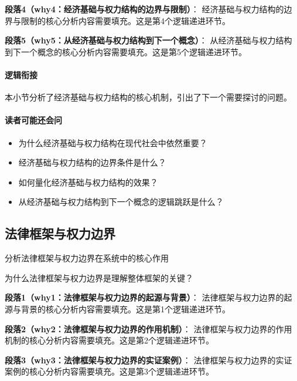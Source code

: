 \documentclass[../main.tex]{subfiles}
\begin{document}
{{\textbf{段落4（why4：经济基础与权力结构的边界与限制）}：
经济基础与权力结构的边界与限制的核心分析内容需要填充。这是第4个逻辑递进环节。


\textbf{段落5（why5：从经济基础与权力结构到下一个概念）}：
从经济基础与权力结构到下一个概念的核心分析内容需要填充。这是第5个逻辑递进环节。


\paragraph*{逻辑衔接}
本小节分析了经济基础与权力结构的核心机制，引出了下一个需要探讨的问题。

\paragraph*{读者可能还会问}
\begin{itemize}
\item 为什么经济基础与权力结构在现代社会中依然重要？
\item 经济基础与权力结构的边界条件是什么？
\item 如何量化经济基础与权力结构的效果？
\item 从经济基础与权力结构到下一个概念的逻辑跳跃是什么？
\end{itemize}


\subsection{法律框架与权力边界}

\begin{motivation}
分析法律框架与权力边界在系统中的核心作用
\end{motivation}

\begin{logicmap}
[逻辑链占位]
\end{logicmap}

\begin{questionbox}
为什么法律框架与权力边界是理解整体框架的关键？
\end{questionbox}

\textbf{段落1（why1：法律框架与权力边界的起源与背景）}：
法律框架与权力边界的起源与背景的核心分析内容需要填充。这是第1个逻辑递进环节。


\textbf{段落2（why2：法律框架与权力边界的作用机制）}：
法律框架与权力边界的作用机制的核心分析内容需要填充。这是第2个逻辑递进环节。


\textbf{段落3（why3：法律框架与权力边界的实证案例）}：
法律框架与权力边界的实证案例的核心分析内容需要填充。这是第3个逻辑递进环节。


}}
\end{document}
